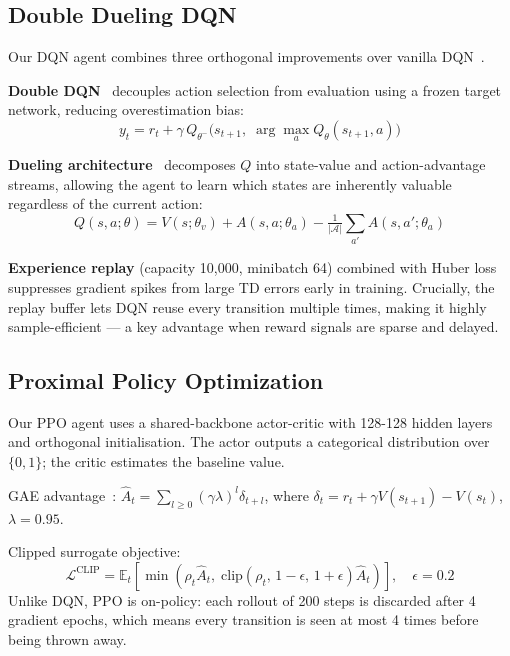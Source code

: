 \documentclass[twoside,11pt]{article}
\begin{document}
\subsection{Double Dueling DQN}

Our DQN agent combines three orthogonal improvements over
vanilla DQN~\citep{mnih2015human}.

\textbf{Double DQN}~\citep{van2016deep} decouples action selection from
evaluation using a frozen target network, reducing overestimation bias:
\begin{equation}
y_t = r_t + \gamma\,Q_{\theta^-}\!\bigl(s_{t+1},\;
      \arg\max_a Q_\theta(s_{t+1}, a)\bigr)
\end{equation}

\textbf{Dueling architecture}~\citep{wang2016dueling} decomposes $Q$ into
state-value and action-advantage streams, allowing the agent to learn which
states are inherently valuable regardless of the current action:
\begin{equation}
Q(s,a;\theta) = V(s;\theta_v) +
A(s,a;\theta_a) - \tfrac{1}{|\mathcal{A}|}\textstyle\sum_{a'}A(s,a';\theta_a)
\end{equation}

\textbf{Experience replay} (capacity 10,000, minibatch 64) combined with
Huber loss suppresses gradient spikes from large TD errors early in training.
Crucially, the replay buffer lets DQN reuse every transition multiple times,
making it highly sample-efficient — a key advantage when reward signals are
sparse and delayed.

\subsection{Proximal Policy Optimization}

Our PPO agent uses a shared-backbone actor-critic with 128-128 hidden layers
and orthogonal initialisation.  The actor outputs a categorical distribution
over $\{0,1\}$; the critic estimates the baseline value.

GAE advantage~\citep{schulman2015high}:
$\hat{A}_t = \sum_{l \ge 0}(\gamma\lambda)^l\delta_{t+l}$, where
$\delta_t = r_t + \gamma V(s_{t+1}) - V(s_t)$, $\lambda{=}0.95$.

Clipped surrogate objective:
\begin{equation}
\mathcal{L}^{\text{CLIP}} =
\mathbb{E}_t\!\left[\min\!\left(
  \rho_t\hat{A}_t,\;
  \text{clip}(\rho_t,\,1{-}\epsilon,\,1{+}\epsilon)\hat{A}_t
\right)\right], \quad \epsilon=0.2
\end{equation}
Unlike DQN, PPO is on-policy: each rollout of 200 steps is discarded after
4 gradient epochs, which means every transition is seen at most 4 times
before being thrown away.
\end{document}

